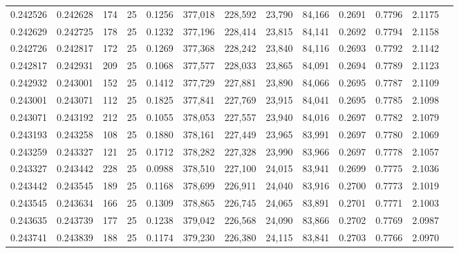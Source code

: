 \begin{tabular}{rrrrrrrrrrrrr}
0.242526 & 0.242628 &   174 &  25 &                                     0.1256 & 377,018 & 228,592 &  23,790 &  84,166 & 0.2691 & 0.7796 & 2.1175 \\
0.242629 & 0.242725 &   178 &  25 &                                     0.1232 & 377,196 & 228,414 &  23,815 &  84,141 & 0.2692 & 0.7794 & 2.1158 \\
0.242726 & 0.242817 &   172 &  25 &                                     0.1269 & 377,368 & 228,242 &  23,840 &  84,116 & 0.2693 & 0.7792 & 2.1142 \\
0.242817 & 0.242931 &   209 &  25 &                                     0.1068 & 377,577 & 228,033 &  23,865 &  84,091 & 0.2694 & 0.7789 & 2.1123 \\
0.242932 & 0.243001 &   152 &  25 &                                     0.1412 & 377,729 & 227,881 &  23,890 &  84,066 & 0.2695 & 0.7787 & 2.1109 \\
0.243001 & 0.243071 &   112 &  25 &                                     0.1825 & 377,841 & 227,769 &  23,915 &  84,041 & 0.2695 & 0.7785 & 2.1098 \\
0.243071 & 0.243192 &   212 &  25 &                                     0.1055 & 378,053 & 227,557 &  23,940 &  84,016 & 0.2697 & 0.7782 & 2.1079 \\
0.243193 & 0.243258 &   108 &  25 &                                     0.1880 & 378,161 & 227,449 &  23,965 &  83,991 & 0.2697 & 0.7780 & 2.1069 \\
0.243259 & 0.243327 &   121 &  25 &                                     0.1712 & 378,282 & 227,328 &  23,990 &  83,966 & 0.2697 & 0.7778 & 2.1057 \\
0.243327 & 0.243442 &   228 &  25 &                                     0.0988 & 378,510 & 227,100 &  24,015 &  83,941 & 0.2699 & 0.7775 & 2.1036 \\
0.243442 & 0.243545 &   189 &  25 &                                     0.1168 & 378,699 & 226,911 &  24,040 &  83,916 & 0.2700 & 0.7773 & 2.1019 \\
0.243545 & 0.243634 &   166 &  25 &                                     0.1309 & 378,865 & 226,745 &  24,065 &  83,891 & 0.2701 & 0.7771 & 2.1003 \\
0.243635 & 0.243739 &   177 &  25 &                                     0.1238 & 379,042 & 226,568 &  24,090 &  83,866 & 0.2702 & 0.7769 & 2.0987 \\
0.243741 & 0.243839 &   188 &  25 &                                     0.1174 & 379,230 & 226,380 &  24,115 &  83,841 & 0.2703 & 0.7766 & 2.0970 \\

\end{tabular}
